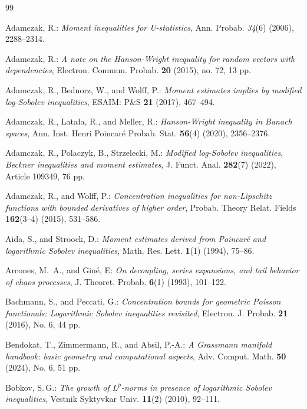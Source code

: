 \documentclass[a4paper,12pt]{amsart}
\numberwithin{equation}{section}
\theoremstyle{remark}
\begin{document}
\begin{thebibliography}{99}

	 Adamczak, R.: \emph{Moment inequalities for U-statistics}, Ann. Probab. \emph{34}(6) (2006), 2288--2314.
	
	 Adamczak, R.: \emph{A note on the {H}anson-{W}right inequality for random vectors with dependencies}, Electron. Commun. Probab. \textbf{20} (2015), no. 72, 13 pp.
	
	 Adamczak, R., Bednorz, W., and Wolff, P.: \emph{Moment estimates implies by modified log-Sobolev inequalities}, ESAIM: P\&S \textbf{21} (2017), 467--494.
	
	 Adamczak, R., Lata{\l}a, R., and Meller, R.: \emph{Hanson-{W}right inequality in {B}anach spaces}, Ann. Inst. Henri Poincar\'{e} Probab. Stat. \textbf{56}(4) (2020), 2356--2376.
	
	 Adamczak, R., Polaczyk, B., Strzelecki, M.: \emph{Modified log-Sobolev inequalities, Beckner inequalities and moment estimates}, J. Funct. Anal. \textbf{282}(7) (2022), Article 109349, 76 pp.
	
	 Adamczak, R., and Wolff, P.: \emph{Concentration inequalities for non-Lipschitz functions with bounded derivatives of higher order}, Probab. Theory Relat. Fields \textbf{162}(3--4) (2015), 531--586.
	
	 Aida, S., and Stroock, D.: \emph{Moment estimates derived from Poincar\'{e} and logarithmic Sobolev inequalities}, Math. Res. Lett. \textbf{1}(1) (1994), 75--86.
	
	 Arcones, M.\, A., and Gin\'{e}, E: \emph{On decoupling, series expansions, and tail behavior of chaos processes}, J. Theoret. Probab. \textbf{6}(1) (1993), 101--122.
	
	 Bachmann, S., and Peccati, G.: \emph{Concentration bounds for geometric Poisson functionals: Logarithmic Sobolev inequalities revisited}, Electron. J. Probab. \textbf{21} (2016), No. 6, 44 pp.
	
	 Bendokat, T., Zimmermann, R., and Absil, P.-A.: \emph{A Grassmann manifold handbook: basic geometry and computational aspects}, Adv. Comput. Math. \textbf{50} (2024), No. 6, 51 pp.
	
	 Bobkov, S.\,G.: \emph{The growth of $L^p$-norms in presence of logarithmic Sobolev inequalities}, Vestnik Syktyvkar Univ. \textbf{11}(2) (2010), 92--111.
	

\end{thebibliography}
\end{document}
